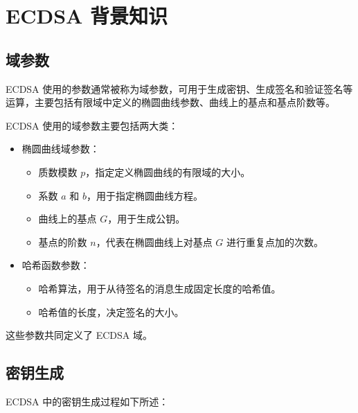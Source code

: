 \documentclass[main\_\_CN.tex]{subfiles}
\begin{document}

\label{sec:ecdsa-terminology}

\section{ECDSA 背景知识}
\subsection{域参数}

ECDSA 使用的参数通常被称为域参数，可用于生成密钥、生成签名和验证签名等运算，主要包括有限域中定义的椭圆曲线参数、曲线上的基点和基点阶数等。

ECDSA 使用的域参数主要包括两大类：

\begin{itemize}
    \item 椭圆曲线域参数：
          \begin{itemize}
              \item 质数模数 $p$，指定定义椭圆曲线的有限域的大小。
              \item 系数 $a$ 和 $b$，用于指定椭圆曲线方程。
              \item 曲线上的基点 $G$，用于生成公钥。
              \item 基点的阶数 $n$，代表在椭圆曲线上对基点 $G$ 进行重复点加的次数。
          \end{itemize}
    \item 哈希函数参数：
          \begin{itemize}
              \item 哈希算法，用于从待签名的消息生成固定长度的哈希值。
              \item 哈希值的长度，决定签名的大小。
          \end{itemize}
\end{itemize}

这些参数共同定义了 ECDSA 域。

\subsection{密钥生成}

ECDSA 中的密钥生成过程如下所述：
\end{document}
